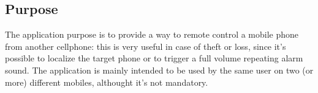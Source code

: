 \subsection{Purpose} 
\small{The application purpose is to provide a way to remote control a mobile phone from another cellphone: this is very useful in case of theft or loss, since it's possible to localize the target phone or to trigger a full volume repeating alarm sound. The application is mainly intended to be used by the same user on two (or more) different mobiles, althought it's not mandatory.}
